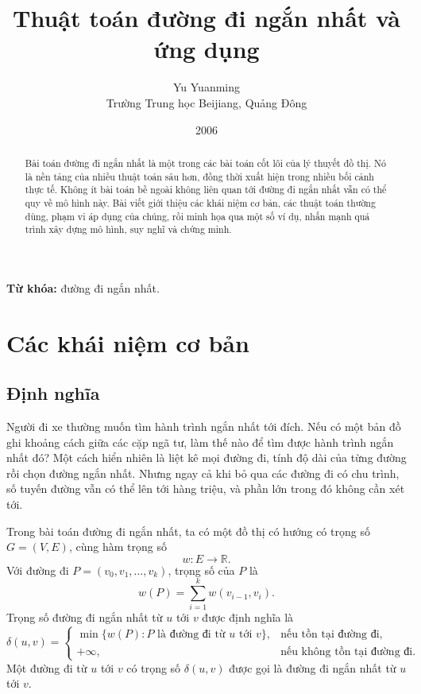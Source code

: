 \documentclass[11pt]{article}
\title{Thuật toán đường đi ngắn nhất và ứng dụng}
\author{Yu Yuanming \\ Trường Trung học Beijiang, Quảng Đông}
\date{2006}
\begin{document}
\maketitle


\renewcommand{\abstractname}{Tóm tắt}
\begin{abstract}
Bài toán đường đi ngắn nhất là một trong các bài toán cốt lõi của lý thuyết
đồ thị. Nó là nền tảng của nhiều thuật toán sâu hơn, đồng thời xuất hiện trong
nhiều bối cảnh thực tế. Không ít bài toán bề ngoài không liên quan tới đường
đi ngắn nhất vẫn có thể quy về mô hình này. Bài viết giới thiệu các khái niệm
cơ bản, các thuật toán thường dùng, phạm vi áp dụng của chúng, rồi minh họa
qua một số ví dụ, nhấn mạnh quá trình xây dựng mô hình, suy nghĩ và chứng minh.
\end{abstract}

\noindent\textbf{Từ khóa:} đường đi ngắn nhất.

\tableofcontents

\section{Các khái niệm cơ bản}

\subsection{Định nghĩa}

Người đi xe thường muốn tìm hành trình ngắn nhất tới đích. Nếu có một bản đồ
ghi khoảng cách giữa các cặp ngã tư, làm thế nào để tìm được hành trình ngắn
nhất đó? Một cách hiển nhiên là liệt kê mọi đường đi, tính độ dài của từng
đường rồi chọn đường ngắn nhất. Nhưng ngay cả khi bỏ qua các đường đi có chu
trình, số tuyến đường vẫn có thể lên tới hàng triệu, và phần lớn trong đó
không cần xét tới.

Trong bài toán đường đi ngắn nhất, ta có một đồ thị có hướng có trọng số
\(G=(V,E)\), cùng hàm trọng số
\[
  w:E\to \mathbb{R}.
\]
Với đường đi \(P=(v_0,v_1,\ldots,v_k)\), trọng số của \(P\) là
\[
  w(P)=\sum_{i=1}^{k} w(v_{i-1},v_i).
\]
Trọng số đường đi ngắn nhất từ \(u\) tới \(v\) được định nghĩa là
\[
  \delta(u,v)=
  \begin{cases}
    \min\{w(P): P \text{ là đường đi từ }u\text{ tới }v\}, & \text{nếu tồn tại đường đi},\\
    +\infty, & \text{nếu không tồn tại đường đi}.
  \end{cases}
\]
Một đường đi từ \(u\) tới \(v\) có trọng số \(\delta(u,v)\) được gọi là đường
đi ngắn nhất từ \(u\) tới \(v\).
\end{document}
